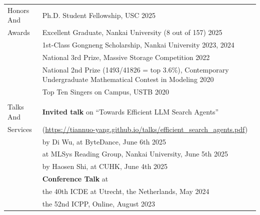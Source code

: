 \documentclass[letterpaper, 10pt]{article}
\begin{document}
\begin{longtable}{p{}p{}}
\nohyphens{\textcolor{OliveGreen}{Honors And}}
& Ph.D. Student Fellowship, USC \hfill 2025 \\
\nohyphens{\textcolor{OliveGreen}{Awards}}
& Excellent Graduate, Nankai University (\textcolor[RGB]{200, 0, 0}{8 out of 157}) \hfill 2025 \\
& 1st-Class Gongneng Scholarship, Nankai University \hfill 2023, 2024 \\
& National 3rd Prize, Massive Storage Competition \hfill 2022 \\
& National 2nd Prize (\textcolor[RGB]{200, 0, 0}{1493/41826 = top 3.6\%}), Contemporary Undergraduate Mathematical Contest in Modeling \hfill 2020 \\
& Top Ten Singers on Campus, USTB \hfill 2020 \\
& \\
 

\nohyphens{\textcolor{OliveGreen}{Talks And}}
& \textbf{Invited talk} on \enquote{Towards Efficient LLM Search Agents} \\
\nohyphens{\textcolor{OliveGreen}{Services}} 
& (\url{https://tiannuo-yang.github.io/talks/efficient_search_agents.pdf}) \\
& \quad\quad by Di Wu, at ByteDance, June 6th 2025 \\
& \quad\quad at MLSys Reading Group, Nankai University, June 5th 2025 \\
& \quad\quad by Haosen Shi, at CUHK, June 4th 2025 
\vspace{0.01\textwidth} \\

& \textbf{Conference Talk} at \\
& \quad\quad the 40th ICDE at Utrecht, the Netherlands, May 2024 \\
& \quad\quad the 52nd ICPP, Online, August 2023
\vspace{0.01\textwidth} \\


\end{longtable}
\end{document}
